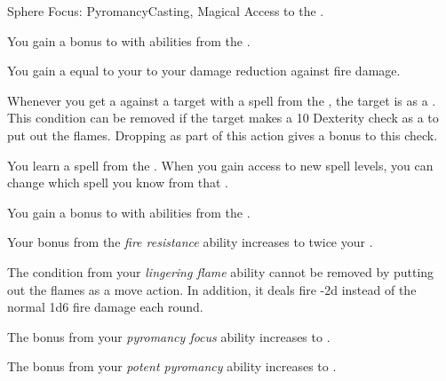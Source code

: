     \begin{feat}{Sphere Focus: Pyromancy}{Casting, Magical}
        \featpre Access to the  .

         You gain a  bonus to  with abilities from the  .

         You gain a  equal to your  to your damage reduction against fire damage.

         Whenever you get a  against a target with a spell from the  , the target is  as a .
        This condition can be removed if the target makes a  10 Dexterity check as a  to put out the flames.
        Dropping  as part of this action gives a  bonus to this check.

         You learn a spell from the  .
        When you gain access to new spell levels, you can change which spell you know from that .

         You gain a  bonus to  with abilities from the  .

         Your bonus from the \textit{fire resistance} ability increases to twice your .

         The  condition from your \textit{lingering flame} ability cannot be removed by putting out the flames as a move action.
        In addition, it deals fire  -2d instead of the normal 1d6 fire damage each round.

         The bonus from your \textit{pyromancy focus} ability increases to .

         The bonus from your \textit{potent pyromancy} ability increases to .
    \end{feat}

